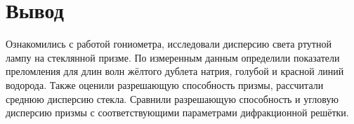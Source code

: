 \documentclass[a4paper, 12pt]{article}%
\begin{document}
\section*{Вывод}

Ознакомились с работой гониометра, исследовали дисперсию света ртутной лампу на стеклянной призме. По измеренным данным определили показатели преломления для длин волн жёлтого дублета натрия, голубой и красной линий водорода. Также оценили разрешающую способность призмы, рассчитали среднюю дисперсию стекла. Сравнили разрешающую способность и угловую дисперсию призмы с соответствующими параметрами дифракционной решётки.
\end{document}
